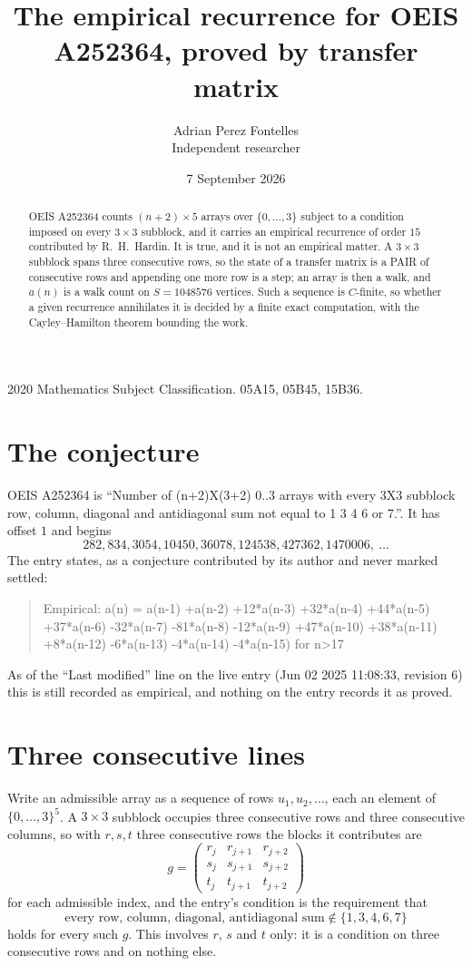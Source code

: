 \documentclass[11pt,a4paper]{article}
\title{The empirical recurrence for OEIS A252364, proved by transfer matrix}
\author{Adrian Perez Fontelles\\ \small Independent researcher}
\date{7 September 2026}
\theoremstyle{plain}
\theoremstyle{definition}
\begin{document}
\maketitle

\begin{abstract}
OEIS A252364 counts $(n+2)\times5$ arrays over $\{0,\dots,3\}$ subject to a condition imposed on
every $3\times3$ subblock, and it carries an empirical recurrence of order $15$
contributed by R.~H.~Hardin. It is true, and it is not an empirical matter. A $3\times3$
subblock spans three consecutive rows, so the state of a transfer matrix is a PAIR of
consecutive rows and appending one more row is a step; an array is then a walk, and
$a(n)$ is a walk count on $S=1048576$ vertices. Such a sequence is $C$-finite, so whether a given
recurrence annihilates it is decided by a finite exact computation, with the Cayley--Hamilton
theorem bounding the work.
\end{abstract}

\noindent\small 2020 Mathematics Subject Classification. 05A15, 05B45, 15B36.\normalsize

\section{The conjecture}

OEIS A252364 is ``Number of (n+2)X(3+2) 0..3 arrays with every 3X3 subblock row, column, diagonal and antidiagonal sum not equal to 1 3 4 6 or 7.''. It has offset $1$ and begins
\[
282, 834, 3054, 10450, 36078, 124538, 427362, 1470006,\ \dots
\]
The entry states, as a conjecture contributed by its author and never marked settled:
\begin{quote}
Empirical: a(n) = a(n-1) +a(n-2) +12*a(n-3) +32*a(n-4) +44*a(n-5) +37*a(n-6) -32*a(n-7) -81*a(n-8) -12*a(n-9) +47*a(n-10) +38*a(n-11) +8*a(n-12) -6*a(n-13) -4*a(n-14) -4*a(n-15) for n>17
\end{quote}
As of the ``Last modified'' line on the live entry (Jun 02 2025 11:08:33, revision 6) this is still
recorded as empirical, and nothing on the entry records it as proved.

\section{Three consecutive lines}

Write an admissible array as a sequence of rows $u_1,u_2,\dots$, each an element of
$\{0,\dots,3\}^{5}$. A $3\times3$ subblock occupies three consecutive rows and
three consecutive columns, so with $r,s,t$ three consecutive rows the blocks it
contributes are
\[
g=\begin{pmatrix}r_j&r_{j+1}&r_{j+2}\\ s_j&s_{j+1}&s_{j+2}\\ t_j&t_{j+1}&t_{j+2}\end{pmatrix}
\]
for each admissible index, and the entry's condition is the requirement that
\[
\text{every row, column, diagonal, antidiagonal sum} \notin \{1,3,4,6,7\}
\]
holds for every such $g$. This involves $r$, $s$ and $t$ only: it is a condition on
three consecutive rows and on nothing else.
\end{document}
